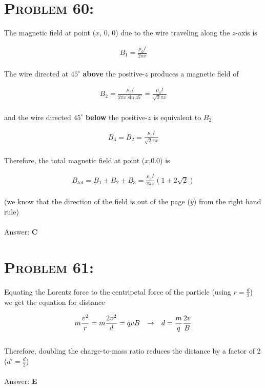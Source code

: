 \documentclass{article}
\begin{document}

\section{\textsc{Problem 60:}} The magnetic field at point ($x$, $0$, $0$) due to the wire traveling along the $z$-axis is

\begin{align}
B_{1} = \frac{\mu_{0} I}{2 \pi x}
\end{align}
\\
The wire directed at $45^{\circ}$ \textbf{above} the positive-$z$ produces a magnetic field of

\begin{align}
B_{2} = \frac{\mu_{0} I}{2 \pi x \sin{45^{\circ}}} =  \frac{\mu_{0} I}{\sqrt{2} \pi x}\nonumber
\end{align}
\\
and the wire directed $45^{\circ}$ \textbf{below} the positive-$z$ is equivalent to $B_{2}$

\begin{align}
B_{3} = B_{2} =  \frac{\mu_{0} I}{\sqrt{2} \pi x}\nonumber
\end{align}
\\
Therefore, the total magnetic field at point ($x$,$0$.$0$) is

\begin{align}
B_{tot} = B_{1} + B_{2} + B_{3} = \boxed{\frac{\mu_{0} I}{2 \pi x} (1 + 2\sqrt{2})}\nonumber
\end{align}
\\
(we know that the direction of the field is out of the page ($\hat{y}$) from the right hand rule)
\\\\
Answer: \textbf{\textcolor{ProcessBlue}C}\\


\section{\textsc{Problem 61:}} Equating the Lorentz force to the centripetal force of the particle (using $r = \frac{d}{2}$) we get the equation for distance

\begin{gather}
m\frac{v^{2}}{r} = m\frac{2v^{2}}{d} = qvB \hspace{.1in} \rightarrow \hspace{.1in} d = \frac{m}{q}\frac{2 v}{B}\nonumber
\end{gather}
\\
Therefore, doubling the charge-to-mass ratio reduces the distance by a factor of 2 ($d' = \frac{d}{2}$)
\\\\
Answer: \textbf{\textcolor{ProcessBlue}E}\\
\end{document}
